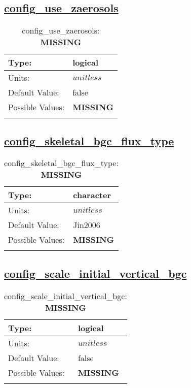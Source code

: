 \subsection[config\_use\_zaerosols]{\hyperref[sec:nm_tab_biogeochemistry]{config\_use\_zaerosols}}
\label{subsec:nm_sec_config_use_zaerosols}
\begin{center}
\begin{longtable}{| p{2.0in} || p{4.0in} |}
    \hline
    Type: & logical \\
    \hline
    Units: & $unitless$ \\
    \hline
    Default Value: & false \\
    \hline
    Possible Values: & {\bf \color{red} MISSING} \\
    \hline
    \caption{config\_use\_zaerosols: {\bf \color{red} MISSING}}
\end{longtable}
\end{center}
\subsection[config\_skeletal\_bgc\_flux\_type]{\hyperref[sec:nm_tab_biogeochemistry]{config\_skeletal\_bgc\_flux\_type}}
\label{subsec:nm_sec_config_skeletal_bgc_flux_type}
\begin{center}
\begin{longtable}{| p{2.0in} || p{4.0in} |}
    \hline
    Type: & character \\
    \hline
    Units: & $unitless$ \\
    \hline
    Default Value: & Jin2006 \\
    \hline
    Possible Values: & {\bf \color{red} MISSING} \\
    \hline
    \caption{config\_skeletal\_bgc\_flux\_type: {\bf \color{red} MISSING}}
\end{longtable}
\end{center}
\subsection[config\_scale\_initial\_vertical\_bgc]{\hyperref[sec:nm_tab_biogeochemistry]{config\_scale\_initial\_vertical\_bgc}}
\label{subsec:nm_sec_config_scale_initial_vertical_bgc}
\begin{center}
\begin{longtable}{| p{2.0in} || p{4.0in} |}
    \hline
    Type: & logical \\
    \hline
    Units: & $unitless$ \\
    \hline
    Default Value: & false \\
    \hline
    Possible Values: & {\bf \color{red} MISSING} \\
    \hline
    \caption{config\_scale\_initial\_vertical\_bgc: {\bf \color{red} MISSING}}
\end{longtable}
\end{center}
